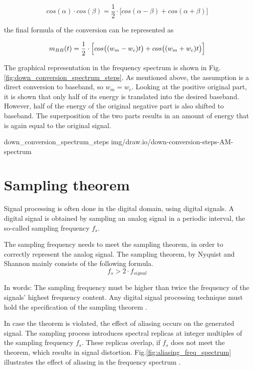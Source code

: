 \begin{equation}
  cos(\alpha) \cdot cos(\beta) = \frac{1}{2} \cdot \bigl[ cos(\alpha-\beta) + cos(\alpha+\beta) \bigr]
\end{equation}

the final formula of the conversion can be represented as

\begin{equation}
 m_{BB}(t) = \frac{1}{2} \cdot \Bigl[ cos\bigl((w_m-w_c)t\bigr) + cos\bigl((w_m+w_c)t\bigr) \Bigr]
\end{equation}

The graphical representation in the frequency spectrum is shown in Fig.\ref{fig:down_conversion_spectrum_steps}.
As mentioned above, the assumption is a direct conversion to baseband, so $w_m = w_c$.
Looking at the positive original part, it is shown that only half of its energy is translated into the desired baseband.
However, half of the energy of the original negative part is also shifted to baseband.
The superposition of the two parts results in an amount of energy that is again equal to the original signal.

 {down_conversion_spectrum_steps} {img/draw.io/down-conversion-steps-AM-spectrum}


\section{Sampling theorem}

Signal processing is often done in the digital domain, using digital signals.
A digital signal is obtained by sampling an analog signal in a periodic interval, the so-called sampling frequency $f_s$.

The sampling frequency needs to meet the sampling theorem, in order to correctly represent the analog signal.
The sampling theorem, by Nyquist and Shannon mainly consists of the following formula.
\begin{equation}
  f_{s} > 2 \cdot f_{signal}
\end{equation}

In words: The sampling frequency must be higher than twice the frequency of the signals' highest frequency content.
Any digital signal processing technique must hold the specification of the sampling theorem \cite[chpt. 4.2]{AlessioSilviaMaria2016DSPa}.

In case the theorem is violated, the effect of aliasing occurs on the generated signal.
The sampling process introduces spectral replicas at integer multiples of the sampling frequency $f_s$.
These replicas overlap, if $f_s$ does not meet the theorem, which results in signal distortion.
Fig.\ref{fig:aliasing_freq_spectrum} illustrates the effect of aliasing in the frequency spectrum \cite{ThyagarajanK.S2019ItDS}.

